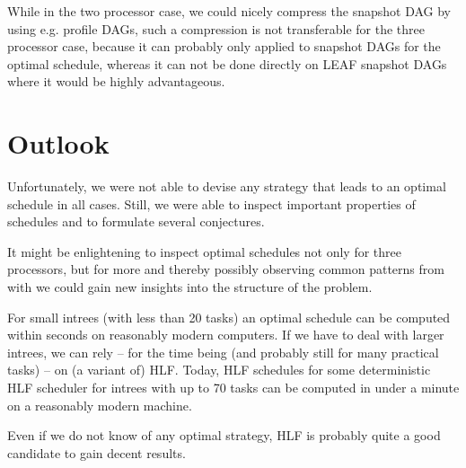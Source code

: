 While in the two processor case, we could nicely compress the snapshot DAG by using e.g. profile DAGs, such a compression is not transferable for the three processor case, because it can probably only applied to snapshot DAGs for the optimal schedule, whereas it can not be done directly on LEAF snapshot DAGs where it would be highly advantageous.

\section{Outlook}
\label{sec:conclusion-outlook}

Unfortunately, we were not able to devise any strategy that leads to an optimal schedule in all cases. Still, we were able to inspect important properties of schedules and to formulate several conjectures.

It might be enlightening to inspect optimal schedules not only for three processors, but for more and thereby possibly observing common patterns from with we could gain new insights into the structure of the problem.

For small intrees (with less than 20 tasks) an optimal schedule can be computed within seconds on reasonably modern computers. If we have to deal with larger intrees, we can rely -- for the time being (and probably still for many practical tasks) -- on (a variant of) HLF. Today, HLF schedules for some deterministic HLF scheduler for intrees with up to 70 tasks can be computed in under a minute on a reasonably modern machine.

Even if we do not know of any optimal strategy, HLF is probably quite a good candidate to gain decent results.


